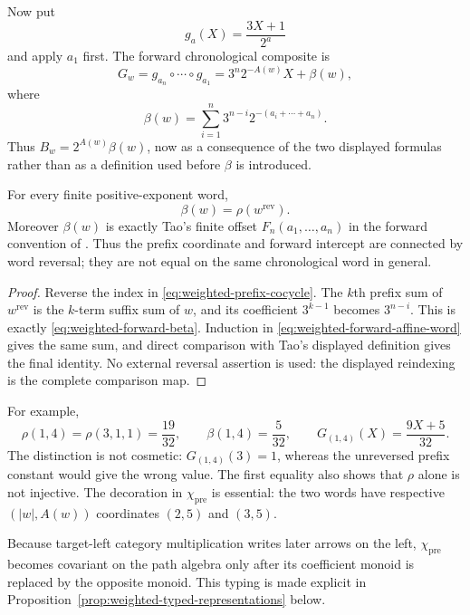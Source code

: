 Now put
\[
 g_a(X)=\frac{3X+1}{2^a}
\]
and apply $a_1$ first.  The forward chronological composite is
\begin{equation}
\label{eq:weighted-forward-affine-word}
 G_w=g_{a_n}\circ\cdots\circ g_{a_1}
 =3^n2^{-A(w)}X+\beta(w),
\end{equation}
where
\begin{equation}
\label{eq:weighted-forward-beta}
 \beta(w)=\sum_{i=1}^n3^{n-i}2^{-(a_i+\cdots+a_n)}.
\end{equation}
Thus $B_w=2^{A(w)}\beta(w)$, now as a consequence of the two displayed
formulas rather than as a definition used before $\beta$ is introduced.

\begin{proposition}
\label{prop:weighted-prefix-forward-reversal}
For every finite positive-exponent word,
\[
 \beta(w)=\rho(w^{\mathrm{rev}}).
\]
Moreover $\beta(w)$ is exactly Tao's finite offset $F_n(a_1,\ldots,a_n)$ in
the forward convention of \cite[source lines 208--229 and
384--393]{Tao2026v7}.  Thus the prefix coordinate and forward intercept are
connected by word reversal; they are not equal on the same chronological
word in general.
\end{proposition}

\begin{proof}
Reverse the index in \eqref{eq:weighted-prefix-cocycle}.  The $k$th prefix
sum of $w^{\mathrm{rev}}$ is the $k$-term suffix sum of $w$, and its
coefficient $3^{k-1}$ becomes $3^{n-i}$.  This is exactly
\eqref{eq:weighted-forward-beta}.  Induction in
\eqref{eq:weighted-forward-affine-word} gives the same sum, and direct
comparison with Tao's displayed definition gives the final identity.  No
external reversal assertion is used: the displayed reindexing is the complete
comparison map.
\end{proof}

For example,
\[
 \rho(1,4)=\rho(3,1,1)=\frac{19}{32},
 \qquad
 \beta(1,4)=\frac5{32},
 \qquad
 G_{(1,4)}(X)=\frac{9X+5}{32}.
\]
The distinction is not cosmetic: $G_{(1,4)}(3)=1$, whereas the unreversed
prefix constant would give the wrong value.  The first equality also shows
that $\rho$ alone is not injective.  The decoration in $\chi_{\mathrm{pre}}$
is essential: the two words have respective $(|w|,A(w))$ coordinates $(2,5)$
and $(3,5)$.

Because target-left category multiplication writes later arrows on the left,
$\chi_{\mathrm{pre}}$ becomes covariant on the path algebra only after its
coefficient monoid is replaced by the opposite monoid.  This typing is made
explicit in Proposition~\ref{prop:weighted-typed-representations} below.

